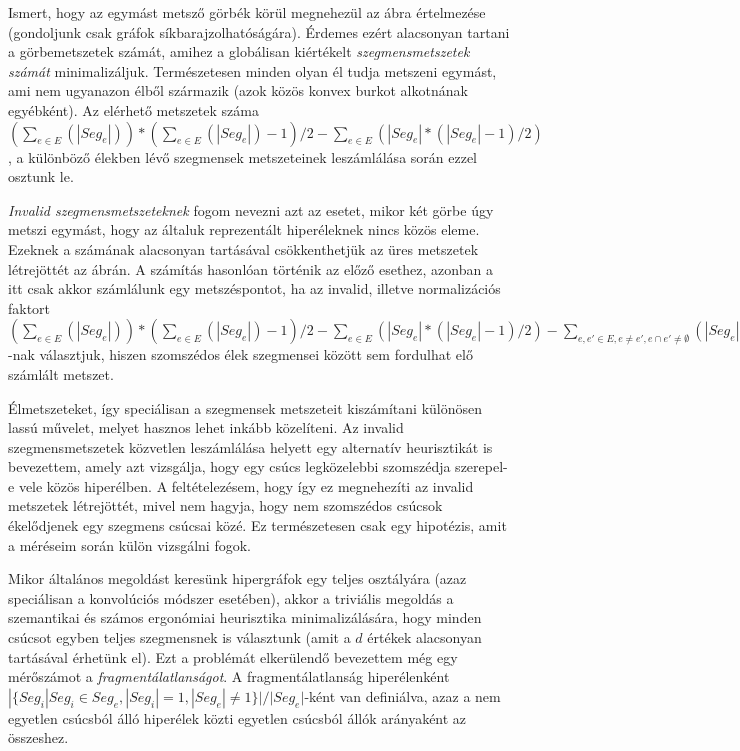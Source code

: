 Ismert, hogy az egymást metsző görbék körül megnehezül az ábra értelmezése (gondoljunk csak gráfok síkbarajzolhatóságára). Érdemes ezért alacsonyan tartani a görbemetszetek számát, amihez a globálisan kiértékelt \textit{szegmensmetszetek számát} minimalizáljuk. Természetesen minden olyan él tudja metszeni egymást, ami nem ugyanazon élből származik (azok közös konvex burkot alkotnának egyébként). Az elérhető metszetek száma $(\sum_{e \in E}(|Seg_e|))*(\sum_{e \in E}(|Seg_e|)-1) / 2 - \sum_{e \in E}(|Seg_e|*(|Seg_e|-1) / 2)$, a különböző élekben lévő szegmensek metszeteinek leszámlálása során ezzel osztunk le.


\textit{Invalid szegmensmetszeteknek} fogom nevezni azt az esetet, mikor két görbe úgy metszi egymást, hogy az általuk reprezentált hiperéleknek nincs közös eleme. Ezeknek a számának alacsonyan tartásával csökkenthetjük az üres metszetek létrejöttét az ábrán. A számítás hasonlóan történik az előző esethez, azonban a itt csak akkor számlálunk egy metszéspontot, ha az invalid, illetve normalizációs faktort $(\sum_{e \in E}(|Seg_e|))*(\sum_{e \in E}(|Seg_e|)-1) / 2 - \sum_{e \in E}(|Seg_e|*(|Seg_e|-1) / 2) - \sum_{e, e' \in E, e \neq e', e \cap e' \neq \emptyset}(|Seg_e|*|Seg_{e'}|)$-nak választjuk, hiszen szomszédos élek szegmensei között sem fordulhat elő számlált metszet.


Élmetszeteket, így speciálisan a szegmensek metszeteit kiszámítani különösen lassú művelet, melyet hasznos lehet inkább közelíteni. Az invalid szegmensmetszetek közvetlen leszámlálása helyett egy alternatív heurisztikát is bevezettem, amely azt vizsgálja, hogy egy csúcs legközelebbi szomszédja szerepel-e vele közös hiperélben. A feltételezésem, hogy így ez megnehezíti az invalid metszetek létrejöttét, mivel nem hagyja, hogy nem szomszédos csúcsok ékelődjenek egy szegmens csúcsai közé. Ez természetesen csak egy hipotézis, amit a méréseim során külön vizsgálni fogok.


Mikor általános megoldást keresünk hipergráfok egy teljes osztályára (azaz speciálisan a konvolúciós módszer esetében), akkor a triviális megoldás a szemantikai és számos ergonómiai heurisztika minimalizálására, hogy minden csúcsot egyben teljes szegmensnek is választunk (amit a $d$ értékek alacsonyan tartásával érhetünk el). Ezt a problémát elkerülendő bevezettem még egy mérőszámot a \textit{fragmentálatlanságot}. A fragmentálatlanság hiperélenként $|\{Seg_i | Seg_i \in Seg_e, |Seg_i| = 1, |Seg_e| \neq 1\}| / |Seg_e|$-ként van definiálva, azaz a nem egyetlen csúcsból álló hiperélek közti egyetlen csúcsból állók arányaként az összeshez.


